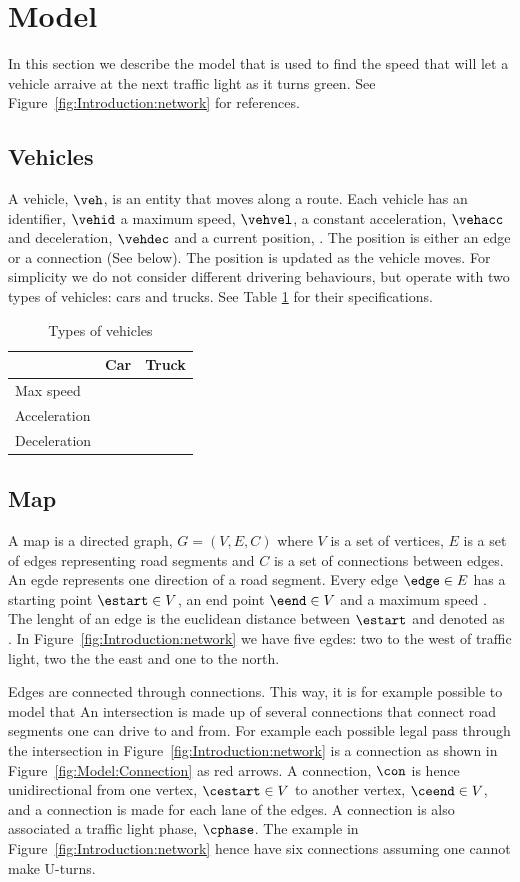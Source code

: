 \section{Model}
In this section we describe the model that is used to find the speed that will let a vehicle arraive at the next traffic light as it turns green.
See Figure~\ref{fig:Introduction:network} for references.

\subsection{Vehicles}
A vehicle, $\veh$, is an entity that moves along a route.
Each vehicle has an identifier, $\vehid$ a maximum speed, $\vehvel$, a constant acceleration, $\vehacc$ and deceleration, $\vehdec$ and a current position, \vehpos. 
The position is either an edge or a connection (See below).
The position is updated as the vehicle moves.
For simplicity we do not consider different drivering behaviours, but operate with two types of vehicles: cars and trucks. See Table \ref{table.vehicleTypes} for their specifications.
\begin{table}
\centering
\begin{tabular}{|l|l|l|}\hline
		& Car 	& Truck \\\hline
Max speed 	& 	& \\\hline
Acceleration 	&	& \\\hline
Deceleration 	&	& \\\hline
\end{tabular}
\caption{Types of vehicles}\label{table.vehicleTypes}
\end{table}

\subsection{Map}
A map is a directed graph, $G = (V, E, C)$ where $V$ is a set of vertices, $E$ is a set of edges representing road segments and $C$ is a set of connections between edges.
An egde represents one direction of a road segment.
Every edge $\edge\in E$ has a starting point $\estart\in V$, an end point $\eend\in V$ and a maximum speed \espeed. 
The lenght of an edge is the euclidean distance between $\estart$ and \eend denoted as \elength.
In Figure~\ref{fig:Introduction:network} we have five egdes: two to the west of traffic light, two the the east and one to the north. %

Edges are connected through connections.
This way, it is for example possible to model that 
An intersection is made up of several connections that connect road segments one can drive to and from.
For example each possible legal pass through the intersection in Figure~\ref{fig:Introduction:network} is a connection as shown in Figure~\ref{fig:Model:Connection} as red arrows. 
A connection, $\con$ is hence unidirectional from one vertex, $\cestart\in V$ to another vertex, $\ceend \in V$, and a connection is made for each lane of the edges.
A connection is also associated a traffic light phase, $\cphase$. 
The example in Figure~\ref{fig:Introduction:network} hence have six connections assuming one cannot make U-turns.

